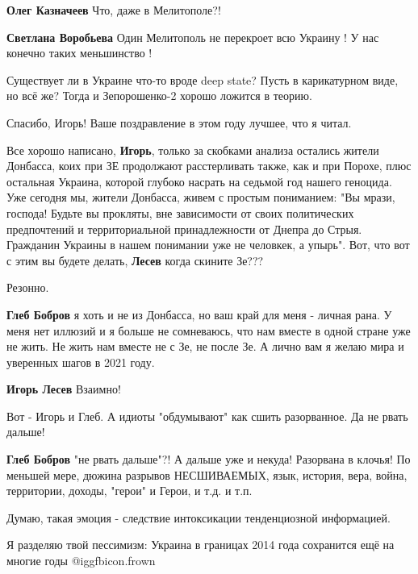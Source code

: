 \begin{itemize}
\begin{itemize}
\textbf{Олег Казначеев} Что, даже в Мелитополе?!

\textbf{Светлана Воробьева} Один Мелитополь не перекроет всю Украину ! У нас конечно таких меньшинство !
\end{itemize} %

Существует ли в Украине что-то вроде deep state? Пусть в карикатурном виде, но всё же? Тогда и Зепорошенко-2 хорошо ложится в теорию.

Спасибо, Игорь! Ваше поздравление в этом году лучшее, что я читал.


Все хорошо написано, \textbf{Игорь}, только за скобками анализа остались жители
Донбасса, коих при ЗЕ продолжают расстерливать также, как и при Порохе, плюс
остальная Украина, которой глубоко насрать на седьмой год нашего геноцида. Уже
сегодня мы, жители Донбасса, живем с простым пониманием: "Вы мрази, господа!
Будьте вы прокляты, вне зависимости от своих политических предпочтений и
территориальной принадлежности от Днепра до Стрыя. Гражданин Украины в нашем
понимании уже не человкек, а упырь". Вот, что вот с этим вы будете делать,
\textbf{Лесев} когда скините Зе???

\begin{itemize} %
Резонно.

\textbf{Глеб Бобров} я хоть и не из Донбасса, но ваш край для меня - личная рана. У меня нет иллюзий и я больше не сомневаюсь, что нам вместе в одной стране уже не жить. Не жить нам вместе не с Зе, не после Зе. А лично вам я желаю мира и уверенных шагов в 2021 году.

\textbf{Игорь Лесев} Взаимно!

Вот - Игорь и Глеб. А идиоты "обдумывают" как сшить разорванное. Да не рвать дальше!

\textbf{Глеб Бобров} "не рвать дальше"?!
А дальше уже и некуда!
Разорвана в клочья!
По меньшей мере, дюжина разрывов НЕСШИВАЕМЫХ, язык, история, вера, война, территории, доходы, "герои" и Герои, и т.д. и т.п.

Думаю, такая эмоция - следствие интоксикации тенденциозной информацией.

\end{itemize} %

Я разделяю твой пессимизм: Украина в границах 2014 года сохранится ещё на многие годы  @igg{fbicon.frown} 


\end{itemize}

